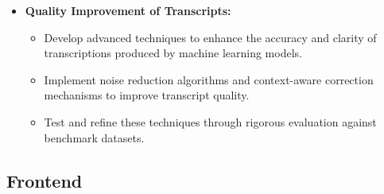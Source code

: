 \begin{itemize}
    \item \textbf{Quality Improvement of Transcripts:}
    \begin{itemize}
        \item Develop advanced techniques to enhance the accuracy and clarity of transcriptions produced by machine learning models.
        \item Implement noise reduction algorithms and context-aware correction mechanisms to improve transcript quality.
        \item Test and refine these techniques through rigorous evaluation against benchmark datasets.
    \end{itemize}
\end{itemize}

\subsection{Frontend}
